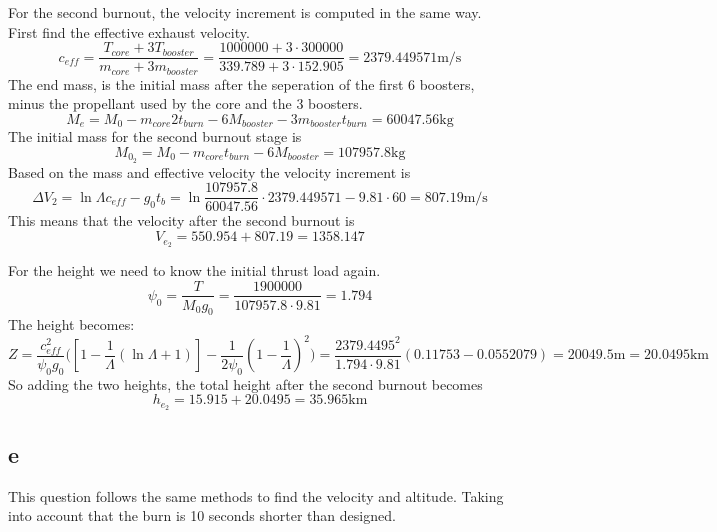 For the second burnout, the velocity increment is computed in the same way. First find the effective exhaust velocity.
\begin{equation}
c_{eff} = \frac{T_{core}+3T_{booster}}{m_{core}+3m_{booster}}=\frac{1000000+3\cdot300000}{339.789+3\cdot152.905}=2379.449571 \text{m/s}
\end{equation}
The end mass, is the initial mass after the seperation of the first 6 boosters, minus the propellant used by the core and the 3 boosters. 
\begin{equation}
M_e = M_0-m_{core}2t_{burn}-6M_{booster}-3m_{booster}t_{burn}=60047.56\text{kg}
\end{equation}
The initial mass for the second burnout stage is 
\begin{equation}
M_{0_2} = M_0-m_{core}t_{burn}-6M_{booster}=107957.8\text{kg}
\end{equation}
Based on the mass and effective velocity the velocity increment is 
\begin{equation}
\Delta V_2 = \ln\Lambda c_{eff}-g_0t_b = \ln\frac{107957.8}{60047.56} \cdot2379.449571-9.81\cdot60= 807.19\text{m/s}
\end{equation}
This means that the velocity after the second burnout is 
\begin{equation}
V_{e_2} = 550.954+807.19=1358.147
\end{equation}

For the height we need to know the initial thrust load again.
\begin{equation}
\psi_0 = \frac{T}{M_0g_0} = \frac{1900000}{107957.8\cdot9.81}=1.794
\end{equation}
The height becomes:
\begin{equation}
Z = \frac{c_{eff}^2}{\psi_0g_0}\Bigg([1-\frac{1}{\Lambda}(\ln\Lambda+1)]-\frac{1}{2\psi_0}(1-\frac{1}{\Lambda})^2\Bigg) = \frac{2379.4495^2}{1.794\cdot9.81}(0.11753-0.0552079) = 20049.5 \text{m} = 20.0495 \text{km}
\end{equation}
So adding the two heights, the total height after the second burnout becomes
\begin{equation}
h_{e_2} = 15.915+ 20.0495 = 35.965 \text{km}
\end{equation}

\subsection{e}
This question follows the same methods to find the velocity and altitude. Taking into account that the burn is 10 seconds shorter than designed.

